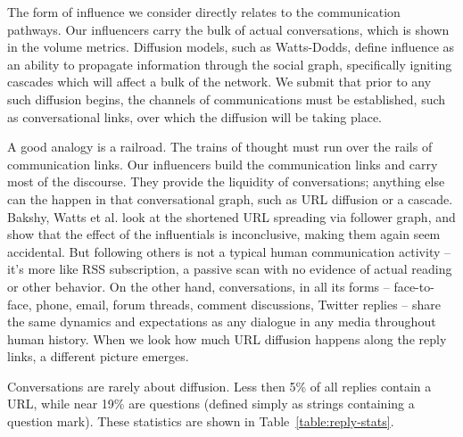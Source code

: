 \documentclass[10pt,oneside]{memoir}
\begin{document}
The form of influence we consider directly relates to the communication pathways.  Our influencers carry the bulk of actual conversations, which is shown in the volume metrics.  Diffusion models, such as Watts-Dodds, define influence as an ability to propagate information through the social graph, specifically igniting cascades which will affect a bulk of the network.  We submit that prior to any such diffusion begins, the channels of communications must be established, such as conversational links, over which the diffusion will be taking place.


A good analogy is a railroad.  The trains of thought must run over the rails of communication links. Our influencers build the communication links and carry most of the discourse.  They provide the liquidity of conversations; anything else can the happen in that conversational graph, such as URL diffusion or a cascade.   Bakshy, Watts et al. \cite{bakshy2011everyone} look at the shortened URL spreading via follower graph, and show that the effect of the influentials is inconclusive, making them again seem accidental.  But following others is not a typical human communication activity -- it's more like RSS subscription, a passive scan with no evidence of actual reading or other behavior.  On the other hand, conversations, in all its forms -- face-to-face, phone, email, forum threads,  comment discussions, Twitter replies -- share the same dynamics and expectations as any dialogue in any media throughout human history.  When we look how much URL diffusion happens along the reply links, a different picture emerges.


Conversations are rarely about diffusion.  Less then 5\% of all replies contain a URL, while near 19\% are questions (defined simply as strings containing a question mark).  These statistics are shown in Table~\ref{table:reply-stats}.
\end{document}
